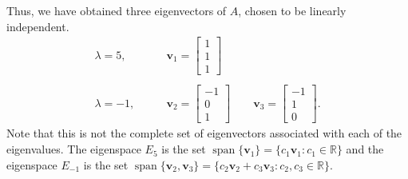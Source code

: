 \documentclass[10pt]{article}
\def\v{\bm{v}}
\def\spn{\operatorname{span}}
\begin{document}
        Thus, we have obtained three eigenvectors of $A$, chosen to be linearly independent.
        \begin{align*}
                \lambda = 5,  & \qquad \v_1 = \begin{bmatrix}1 \\ 1 \\ 1\end{bmatrix} \\\\
                \lambda = -1, & \qquad \v_2 = \begin{bmatrix}-1 \\ 0 \\ 1 \end{bmatrix} \qquad
                        \v_3 = \begin{bmatrix}-1 \\ 1 \\ 0 \end{bmatrix}.
        \end{align*}
        Note that this is not the complete set of eigenvectors associated with each of the eigenvalues.
        The eigenspace $E_5$ is the set $\spn\{\v_1\} = \{c_1\v_1\colon c_1\in \mathbb{R}\}$ and the eigenspace $E_{-1}$ is the set
        $\spn\{\v_2, \v_3\} = \{c_2\v_2 + c_3\v_3\colon c_2, c_3 \in \mathbb{R}\}$. \\
        
\end{document}
